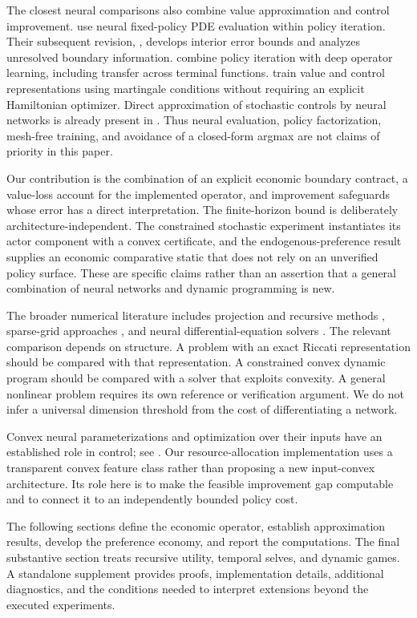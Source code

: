 The closest neural comparisons also combine value approximation and control improvement. \citet{kim2025} use neural fixed-policy PDE evaluation within policy iteration. Their subsequent revision, \citet{kim2026}, develops interior error bounds and analyzes unresolved boundary information. \citet{lee2024} combine policy iteration with deep operator learning, including transfer across terminal functions. \citet{cai2025} train value and control representations using martingale conditions without requiring an explicit Hamiltonian optimizer. Direct approximation of stochastic controls by neural networks is already present in \citet{han2016}. Thus neural evaluation, policy factorization, mesh-free training, and avoidance of a closed-form argmax are not claims of priority in this paper.

Our contribution is the combination of an explicit economic boundary contract, a value-loss account for the implemented operator, and improvement safeguards whose error has a direct interpretation. The finite-horizon bound is deliberately architecture-independent. The constrained stochastic experiment instantiates its actor component with a convex certificate, and the endogenous-preference result supplies an economic comparative static that does not rely on an unverified policy surface. These are specific claims rather than an assertion that a general combination of neural networks and dynamic programming is new.

The broader numerical literature includes projection and recursive methods \citep{judd1998,stokey1989}, sparse-grid approaches \citep{brumm2017}, and neural differential-equation solvers \citep{raissi2019,han2018}. The relevant comparison depends on structure. A problem with an exact Riccati representation should be compared with that representation. A constrained convex dynamic program should be compared with a solver that exploits convexity. A general nonlinear problem requires its own reference or verification argument. We do not infer a universal dimension threshold from the cost of differentiating a network.

Convex neural parameterizations and optimization over their inputs have an established role in control; see \citet{amos2017}. Our resource-allocation implementation uses a transparent convex feature class rather than proposing a new input-convex architecture. Its role here is to make the feasible improvement gap computable and to connect it to an independently bounded policy cost.


The following sections define the economic operator, establish approximation results, develop the preference economy, and report the computations. The final substantive section treats recursive utility, temporal selves, and dynamic games. A standalone supplement provides proofs, implementation details, additional diagnostics, and the conditions needed to interpret extensions beyond the executed experiments.
